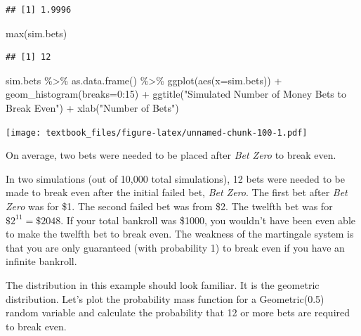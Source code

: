 \documentclass[
  11pt,
]{book}
\newenvironment{Shaded}{\begin{snugshade}}{\end{snugshade}}
\newcommand{\AttributeTok}[1]{\textcolor[rgb]{0.77,0.63,0.00}{#1}}
\newcommand{\DecValTok}[1]{\textcolor[rgb]{0.00,0.00,0.81}{#1}}
\newcommand{\FunctionTok}[1]{\textcolor[rgb]{0.00,0.00,0.00}{#1}}
\newcommand{\NormalTok}[1]{#1}
\newcommand{\SpecialCharTok}[1]{\textcolor[rgb]{0.00,0.00,0.00}{#1}}
\newcommand{\StringTok}[1]{\textcolor[rgb]{0.31,0.60,0.02}{#1}}
\theoremstyle{definition}
\theoremstyle{definition}
\theoremstyle{definition}
\theoremstyle{definition}
\theoremstyle{remark}
\begin{document}
\begin{verbatim}
## [1] 1.9996
\end{verbatim}

\begin{Shaded}
\begin{Highlighting}[]
\FunctionTok{max}\NormalTok{(sim.bets)}
\end{Highlighting}
\end{Shaded}

\begin{verbatim}
## [1] 12
\end{verbatim}

\begin{Shaded}
\begin{Highlighting}[]
\NormalTok{sim.bets }\SpecialCharTok{\%\textgreater{}\%} \FunctionTok{as.data.frame}\NormalTok{() }\SpecialCharTok{\%\textgreater{}\%} 
  \FunctionTok{ggplot}\NormalTok{(}\FunctionTok{aes}\NormalTok{(}\AttributeTok{x=}\NormalTok{sim.bets)) }\SpecialCharTok{+} 
  \FunctionTok{geom\_histogram}\NormalTok{(}\AttributeTok{breaks=}\DecValTok{0}\SpecialCharTok{:}\DecValTok{15}\NormalTok{) }\SpecialCharTok{+}
  \FunctionTok{ggtitle}\NormalTok{(}\StringTok{"Simulated Number of Money Bets to Break Even"}\NormalTok{) }\SpecialCharTok{+} 
  \FunctionTok{xlab}\NormalTok{(}\StringTok{"Number of Bets"}\NormalTok{)}
\end{Highlighting}
\end{Shaded}

\texttt{[image: textbook\_files/figure-latex/unnamed-chunk-100-1.pdf]}

On average, two bets were needed to be placed after \emph{Bet Zero} to break even.

\newpage

In two simulations (out of 10,000 total simulations), 12 bets were needed to be made to break even after the initial failed bet, \emph{Bet Zero}. The first bet after \emph{Bet Zero} was for \$1. The second failed bet was from \$2. The twelfth bet was for \(\$2^{11} = \$2048\). If your total bankroll was \$1000, you wouldn't have been even able to make the twelfth bet to break even. The weakness of the martingale system is that you are only guaranteed (with probability 1) to break even if you have an infinite bankroll.

The distribution in this example should look familiar. It is the geometric distribution. Let's plot the probability mass function for a Geometric(0.5) random variable and calculate the probability that 12 or more bets are required to break even.
\end{document}
